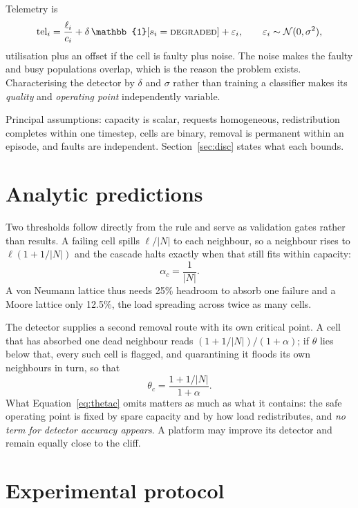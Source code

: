 \documentclass[11pt,a4paper]{article}
\begin{document}
Telemetry is
\begin{equation}
\mathrm{tel}_i = \frac{\ell_i}{c_i} + \delta\,\mathbb{1}[s_i = \textsc{degraded}] + \varepsilon_i, \qquad \varepsilon_i \sim \mathcal{N}(0,\sigma^2),
\end{equation}
utilisation plus an offset if the cell is faulty plus noise. The noise makes the
faulty and busy populations overlap, which is the reason the problem exists.
Characterising the detector by $\delta$ and $\sigma$ rather than training a
classifier makes its \emph{quality} and \emph{operating point} independently
variable.

Principal assumptions: capacity is scalar, requests homogeneous, redistribution
completes within one timestep, cells are binary, removal is permanent within an
episode, and faults are independent. Section~\ref{sec:disc} states what each
bounds.

\section{Analytic predictions}

Two thresholds follow directly from the rule and serve as validation gates
rather than results. A failing cell spills $\ell/|N|$ to each neighbour, so a
neighbour rises to $\ell(1 + 1/|N|)$ and the cascade halts exactly when that
still fits within capacity:
\begin{equation}
\alpha_c = \frac{1}{|N|}.
\end{equation}
A von Neumann lattice thus needs 25\% headroom to absorb one failure and a Moore
lattice only 12.5\%, the load spreading across twice as many cells.

The detector supplies a second removal route with its own critical point. A cell
that has absorbed one dead neighbour reads $(1 + 1/|N|)/(1+\alpha)$; if $\theta$
lies below that, every such cell is flagged, and quarantining it floods its own
neighbours in turn, so that
\begin{equation}
\theta_c = \frac{1 + 1/|N|}{1+\alpha}.
\label{eq:thetac}
\end{equation}
What Equation~\ref{eq:thetac} omits matters as much as what it contains: the
safe operating point is fixed by spare capacity and by how load redistributes,
and \emph{no term for detector accuracy appears}. A platform may improve its
detector and remain equally close to the cliff.

\section{Experimental protocol}
\end{document}
